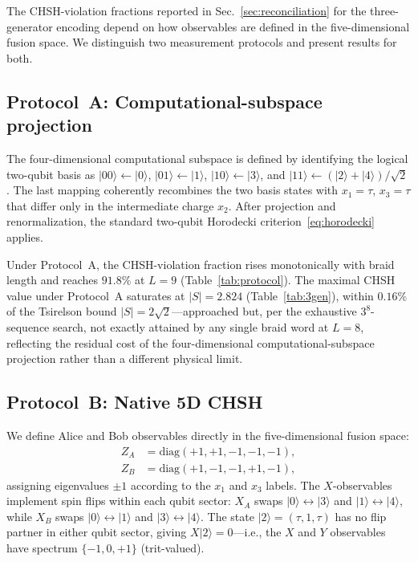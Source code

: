 \documentclass[aps,pra,twocolumn,superscriptaddress,longbibliography,floatfix,nofootinbib]{revtex4-2}
\begin{document}
The CHSH-violation fractions reported in Sec.~\ref{sec:reconciliation}
for the three-generator encoding depend on how observables are defined
in the five-dimensional fusion space.
We distinguish two measurement protocols and present results for both.

\subsection{Protocol~A: Computational-subspace projection}

The four-dimensional computational subspace is defined by identifying
the logical two-qubit basis as
$|00\rangle \leftarrow |0\rangle$,
$|01\rangle \leftarrow |1\rangle$,
$|10\rangle \leftarrow |3\rangle$, and
$|11\rangle \leftarrow (|2\rangle + |4\rangle)/\sqrt{2}$.
The last mapping coherently recombines the two basis states
with $x_1=\tau$, $x_3=\tau$ that differ only in the intermediate
charge $x_2$.
After projection and renormalization, the standard two-qubit
Horodecki criterion~\eqref{eq:horodecki} applies.

Under Protocol~A, the CHSH-violation fraction rises monotonically
with braid length and reaches $91.8\%$ at $L=9$
(Table~\ref{tab:protocol}).
The maximal CHSH value under Protocol~A saturates at $|S|=2.824$
(Table~\ref{tab:3gen}), within $0.16\%$ of the Tsirelson bound
$|S|=2\sqrt{2}$---approached but, per the exhaustive $3^8$-sequence
search, not exactly attained by any single braid word at $L=8$,
reflecting the residual cost of the four-dimensional
computational-subspace projection rather than a different physical
limit.

\subsection{Protocol~B: Native 5D CHSH}

We define Alice and Bob observables directly in the five-dimensional
fusion space:
\begin{align}
Z_A &= \text{diag}(+1,+1,-1,-1,-1), \label{eq:ZA} \\
Z_B &= \text{diag}(+1,-1,-1,+1,-1), \label{eq:ZB}
\end{align}
assigning eigenvalues $\pm 1$ according to the $x_1$ and $x_3$ labels.
The $X$-observables implement spin flips within each qubit sector:
$X_A$ swaps $|0\rangle\leftrightarrow|3\rangle$ and
$|1\rangle\leftrightarrow|4\rangle$, while $X_B$ swaps
$|0\rangle\leftrightarrow|1\rangle$ and
$|3\rangle\leftrightarrow|4\rangle$.
The state $|2\rangle = (\tau,1,\tau)$ has no flip partner in either
qubit sector, giving $X|2\rangle = 0$---i.e., the $X$ and $Y$
observables have spectrum $\{-1,0,+1\}$ (trit-valued).
\end{document}
